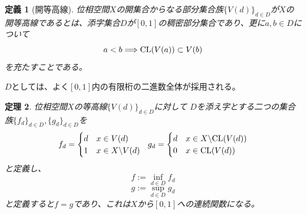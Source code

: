 \documentclass[leqno]{jsarticle}
\newtheorem{thm}{定理}
\newtheorem{df}[thm]{定義}
\newcommand{\To}{\Longrightarrow}
\newcommand{\cl}{\text{{\rm CL}} }
\begin{document}
\begin{df}[開等高線]
位相空間$X$の開集合からなる部分集合族$\{V(d)\}_{d\in D}$が$X$の開等高線であるとは、添字集合$D$が$[0,1]$の稠密部分集合であり、更に$a,b\in D$について
\[
a<b\To \cl(V(a))\subset V(b)
\]
を充たすことである。
\end{df}
$D$としては、よく$[0,1]$内の有限桁の二進数全体が採用される。

\begin{thm}\label{func}
位相空間$X$の等高線$\{V(d)\}_{d\in D}$に対して
$D$を添え字とする二つの集合族$\{f_d\}_{d\in D}, \{g_d\}_{d\in D}$を
\[
f_d=\begin{cases}
 d & \text{$x\in V(d)$} \\
 1 & \text{$x\in X\backslash V(d)$}
\end{cases}\ \ 
g_d=\begin{cases}
 d & \text{$x\in X\backslash \cl(V(d))$} \\
 0 & \text{$x\in \cl(V(d))$}
\end{cases}
\]
と定義し、
\[
f:=\inf_{d\in D}f_d
\]
\[
g:=\sup_{d\in D}g_d
\]
と定義すると$f=g$であり、これは$X$から$[0,1]$への連続関数になる。
\end{thm}
\end{document}
